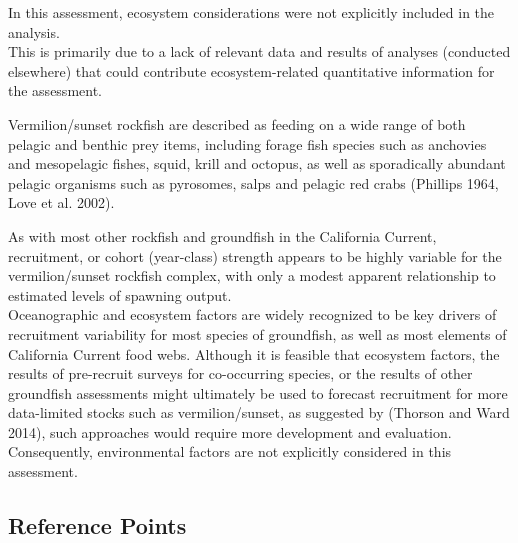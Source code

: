 \documentclass[11pt,
  english,
  a4paper,
]{article}
\begin{document}
\leavevmode\tagmcend\tagstructend

In this assessment, ecosystem considerations were not explicitly included in the analysis.\\
This is primarily due to a lack of relevant data and results of analyses (conducted elsewhere) that could contribute ecosystem-related quantitative information for the assessment.

Vermilion/sunset rockfish are described as feeding on a wide range of both pelagic and benthic prey items, including forage fish species such as anchovies and mesopelagic fishes, squid, krill and octopus, as well as sporadically abundant pelagic organisms such as pyrosomes, salps and pelagic red crabs {(Phillips 1964, Love et al. 2002)\leavevmode\tagmcend\tagstructend}.

As with most other rockfish and groundfish in the California Current, recruitment, or cohort (year-class) strength appears to be highly variable for the vermilion/sunset rockfish complex, with only a modest apparent relationship to estimated levels of spawning output.\\
Oceanographic and ecosystem factors are widely recognized to be key drivers of recruitment variability for most species of groundfish, as well as most elements of California Current food webs. Although it is feasible that ecosystem factors, the results of pre-recruit surveys for co-occurring species, or the results of other groundfish assessments might ultimately be used to forecast recruitment for more data-limited stocks such as vermilion/sunset, as suggested by {(Thorson and Ward 2014)\leavevmode\tagmcend\tagstructend}, such approaches would require more development and evaluation. Consequently, environmental factors are not explicitly considered in this assessment.

\FloatBarrier


\hypertarget{reference-points}{%
\subsection*{Reference Points}\label{reference-points}}

\leavevmode\tagmcend\tagstructend
\end{document}
